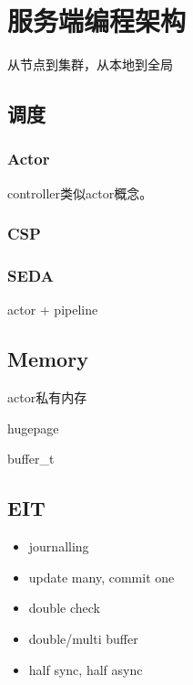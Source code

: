 \chapter{服务端编程架构}

从节点到集群，从本地到全局

\section{调度}

\subsection{Actor}

controller类似actor概念。

\subsection{CSP}

\subsection{SEDA}

actor + pipeline

\section{Memory}

\begin{enumbox}
\item actor私有内存
\item hugepage
\item buffer\_t
\end{enumbox}

\section{EIT}

\begin{itemize}
    \item journalling
    \item update many, commit one
    \item double check
    \item double/multi buffer
    \item half sync, half async
\end{itemize}
